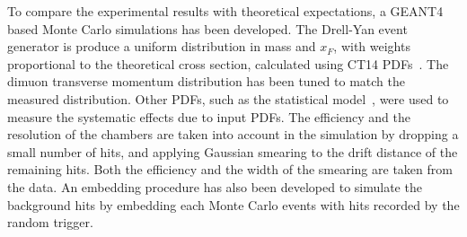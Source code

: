 \documentclass[reprint,aps,unsortedaddress,superscriptaddress,prl,floatfix,showpacs,linenumbers,final]{revtex4-2}
\begin{document}
To compare the experimental results with theoretical expectations,
a GEANT4~\cite{agostinelli2003,allison2006,allison2016} based Monte Carlo simulations has been developed.
The Drell-Yan event generator is produce a uniform distribution in mass and $x_F$,
with weights proportional to the theoretical cross section, calculated using CT14 PDFs~\cite{hou2018}.
The dimuon transverse momentum distribution has been tuned to match the measured distribution.
Other PDFs, such as the statistical model~\cite{soffer2019}, were used to measure the systematic effects due to input PDFs.
The efficiency and the resolution of the chambers are taken into account in the simulation
by dropping a small number of hits, and applying Gaussian smearing to the drift distance of the remaining hits.
Both the efficiency and the width of the smearing are taken from the data.
An embedding procedure has also been developed to simulate the background hits by embedding each Monte Carlo events
with hits recorded by the random trigger.
\end{document}

